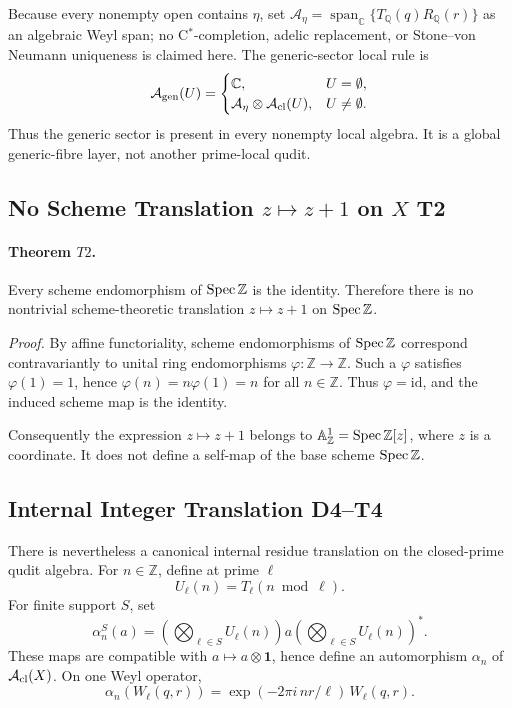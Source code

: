 Because every nonempty open contains \(\eta\), set
\(\mathcal A_\eta=\operatorname{span}_{\mathbb C}\{T_\mathbb Q(q)R_\mathbb Q(r)\}\)
as an algebraic Weyl span; no C\(^*\)-completion, adelic replacement, or
Stone--von Neumann uniqueness is claimed here.  The generic-sector local rule is
\[
  \mathcal A_{\rm gen}(U)=
  \begin{cases}\mathbb C,&U=\emptyset,\\
  \mathcal A_\eta\otimes\mathcal A_{\rm cl}(U),&U\ne\emptyset.\end{cases}
\]
Thus the generic sector is present in every nonempty local algebra.  It is a
global generic-fibre layer, not another prime-local qudit.

\subsection[No Scheme Translation on X]{No Scheme Translation \(z\mapsto z+1\) on \(X\) T2}
\paragraph{Theorem \(T2\).}
Every scheme endomorphism of \(\operatorname{Spec}\mathbb Z\) is the identity.  Therefore
there is no nontrivial scheme-theoretic translation \(z\mapsto z+1\) on
\(\operatorname{Spec}\mathbb Z\).

\emph{Proof.}
By affine functoriality, scheme endomorphisms of \(\operatorname{Spec}\mathbb Z\) correspond
contravariantly to unital ring endomorphisms \(\varphi:\mathbb Z\to\mathbb Z\).
Such a \(\varphi\) satisfies \(\varphi(1)=1\), hence
\(\varphi(n)=n\varphi(1)=n\) for all \(n\in\mathbb Z\).  Thus
\(\varphi=\mathrm{id}\), and the induced scheme map is the identity.

Consequently the expression \(z\mapsto z+1\) belongs to
\(\mathbb A^1_\mathbb Z=\operatorname{Spec}\mathbb Z[z]\), where \(z\) is a coordinate.  It
does not define a self-map of the base scheme \(\operatorname{Spec}\mathbb Z\).

\subsection{Internal Integer Translation D4--T4}
There is nevertheless a canonical internal residue translation on the
closed-prime qudit algebra.  For \(n\in\mathbb Z\), define at prime \(\ell\)
\[
  U_\ell(n)=T_\ell(n\bmod \ell).
\]
For finite support \(S\), set
\[
  \alpha_n^S(a)=
  \left(\bigotimes_{\ell\in S}U_\ell(n)\right)
  a
  \left(\bigotimes_{\ell\in S}U_\ell(n)\right)^* .
\]
These maps are compatible with \(a\mapsto a\otimes\mathbf 1\), hence define an
automorphism \(\alpha_n\) of \(\mathcal A_{\rm cl}(X)\).  On one Weyl operator,
\[
  \alpha_n(W_\ell(q,r))
  =
  \exp(-2\pi i\,nr/\ell)\,W_\ell(q,r).
\]


